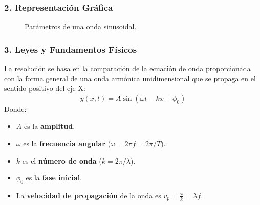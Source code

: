 \subsubsection*{2. Representación Gráfica}
\begin{figure}[H]
    \centering
    \caption{Parámetros de una onda sinusoidal.}
\end{figure}

\subsubsection*{3. Leyes y Fundamentos Físicos}
La resolución se basa en la comparación de la ecuación de onda proporcionada con la forma general de una onda armónica unidimensional que se propaga en el sentido positivo del eje X:
$$ y(x,t) = A\sin(\omega t - kx + \phi_0) $$
Donde:
\begin{itemize}
    \item $A$ es la \textbf{amplitud}.
    \item $\omega$ es la \textbf{frecuencia angular} ($\omega = 2\pi f = 2\pi/T$).
    \item $k$ es el \textbf{número de onda} ($k = 2\pi/\lambda$).
    \item $\phi_0$ es la \textbf{fase inicial}.
    \item La \textbf{velocidad de propagación} de la onda es $v_p = \frac{\omega}{k} = \lambda f$.
\end{itemize}

